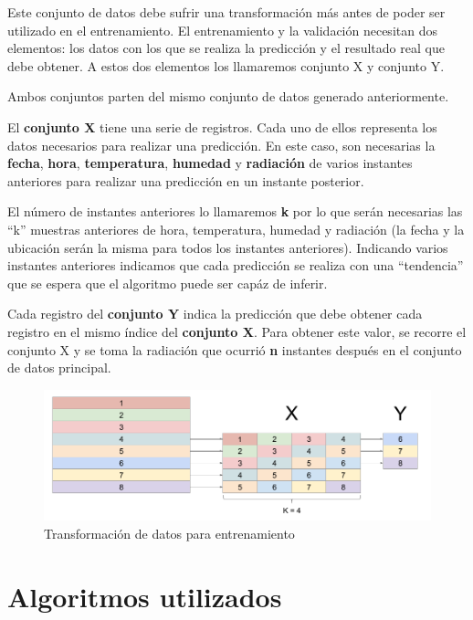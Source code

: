 Este conjunto de datos debe sufrir una transformación más antes de poder ser utilizado en el entrenamiento. El entrenamiento y la validación necesitan dos elementos: los datos con los que se realiza la predicción y el resultado real que debe obtener. A estos dos elementos los llamaremos conjunto X y conjunto Y.

Ambos conjuntos parten del mismo conjunto de datos generado anteriormente.

El \textbf{conjunto X} tiene una serie de registros. Cada uno de ellos representa los datos necesarios para realizar una predicción. En este caso, son necesarias la \textbf{fecha}, \textbf{hora}, \textbf{temperatura}, \textbf{humedad} y \textbf{radiación} de varios instantes anteriores para realizar una predicción en un instante posterior.

El número de instantes anteriores lo llamaremos \textbf{k} por lo que serán necesarias las ``k'' muestras anteriores de hora, temperatura, humedad y radiación (la fecha y la ubicación serán la misma para todos los instantes anteriores). Indicando varios instantes anteriores indicamos que cada predicción se realiza con una ``tendencia'' que se espera que el algoritmo puede ser capáz de inferir.

Cada registro del \textbf{conjunto Y} indica la predicción que debe obtener cada registro en el mismo índice del \textbf{conjunto X}. Para obtener este valor, se recorre el conjunto X y se toma la radiación que ocurrió \textbf{n} instantes después en el conjunto de datos principal.

\begin{figure}[htb]
	\begin{center}
		\includegraphics[width=14cm]{figures/datos_x_y.png}
		\caption{Transformación de datos para entrenamiento}
	\end{center}
	\label{x_y}
\end{figure}

\section{Algoritmos utilizados}
\label{makereference4.3}

